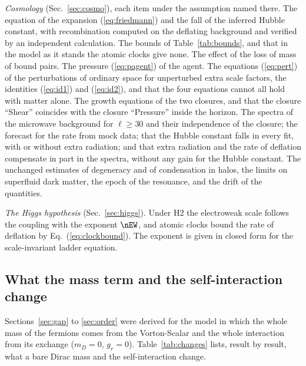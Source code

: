 \emph{Cosmology} (Sec.~\ref{sec:cosmo}), each item under the assumption named there. The equation of
the expansion (\ref{eq:friedmann}) and the fall of the inferred Hubble constant, with recombination
computed on the deflating background and verified by an independent calculation. The bounds of
Table~\ref{tab:bounds}, and that in the model as it stands the atomic clocks give none. The effect
of the loss of mass of bound pairs. The pressure (\ref{eq:pagent}) of the agent. The equations
(\ref{eq:pert}) of the perturbations of ordinary space for unperturbed extra scale factors, the
identities (\ref{eq:id1}) and (\ref{eq:id2}), and that the four equations cannot all hold with matter
alone. The growth equations of the two closures, and that the closure ``Shear'' coincides with the
closure ``Pressure'' inside the horizon. The spectra of the microwave background for $\ell\ge30$ and
their independence of the closure; the forecast for the rate from mock data; that the Hubble
constant falls in every fit, with or without extra radiation; and that extra radiation and the rate
of deflation compensate in part in the spectra, without any gain for the Hubble constant. The
unchanged estimates of degeneracy
and of condensation in halos, the limits on superfluid dark matter, the epoch of the resonance, and
the drift of the quantities.

\emph{The Higgs hypothesis} (Sec.~\ref{sec:higgs}). Under H2 the electroweak scale follows the
coupling with the exponent $\nEW$, and atomic clocks bound the rate of deflation by
Eq.~(\ref{eq:clockbound}). The exponent is given in closed form for the scale-invariant ladder
equation.

\subsection{What the mass term and the self-interaction change}
\label{sec:changes}

Sections~\ref{sec:gap} to \ref{sec:order} were derived for the model in which the whole mass of the
fermions comes from the Vorton-Scalar and the whole interaction from its exchange ($m_D=0$,
$g_r=0$). Table~\ref{tab:changes} lists, result by result, what a bare Dirac mass and the
self-interaction change.

